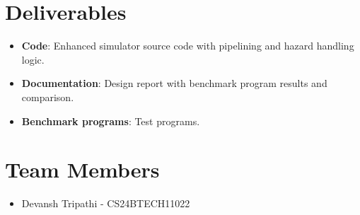 \documentclass{report}
\begin{document}
\section{Deliverables}
\begin{itemize}
    \item \textbf{Code}: Enhanced simulator source code with pipelining and hazard handling logic.
    \item \textbf{Documentation}: Design report with benchmark program results and comparison.
    \item \textbf{Benchmark programs}: Test programs.
\end{itemize}

\section{Team Members}
\begin{itemize}
    \item Devansh Tripathi - CS24BTECH11022
\end{itemize}
\end{document}
